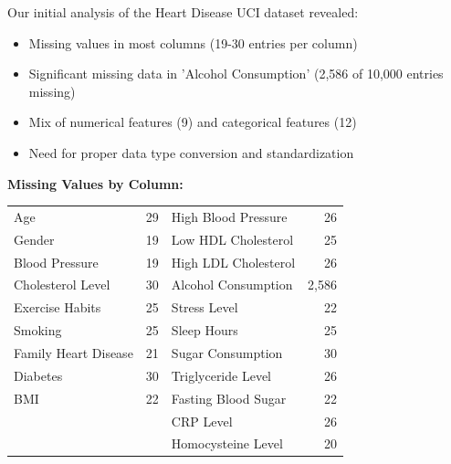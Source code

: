 \documentclass[11pt,a4paper]{article}
\begin{document}
\begin{tcolorbox}[
        title=Data Quality Issues Overview,
        colback=lightpurple!30,
        colframe=mediumpurple,
        boxrule=0.5pt,
        fonttitle=\bfseries\sffamily\footnotesize,
        fontupper=\footnotesize
    ]
    Our initial analysis of the Heart Disease UCI dataset revealed:
    \begin{itemize}[leftmargin=*, itemsep=2pt, parsep=0pt]
        \item Missing values in most columns (19-30 entries per column)
        \item Significant missing data in 'Alcohol Consumption' (2,586 of 10,000 entries missing)
        \item Mix of numerical features (9) and categorical features (12)
        \item Need for proper data type conversion and standardization
    \end{itemize}

    \textbf{Missing Values by Column:}

    \begin{tabular}{lr|lr}
        Age                  & 29 & High Blood Pressure  & 26    \\
        Gender               & 19 & Low HDL Cholesterol  & 25    \\
        Blood Pressure       & 19 & High LDL Cholesterol & 26    \\
        Cholesterol Level    & 30 & Alcohol Consumption  & 2,586 \\
        Exercise Habits      & 25 & Stress Level         & 22    \\
        Smoking              & 25 & Sleep Hours          & 25    \\
        Family Heart Disease & 21 & Sugar Consumption    & 30    \\
        Diabetes             & 30 & Triglyceride Level   & 26    \\
        BMI                  & 22 & Fasting Blood Sugar  & 22    \\
                             &    & CRP Level            & 26    \\
                             &    & Homocysteine Level   & 20    \\
    \end{tabular}
\end{tcolorbox}
\end{document}
